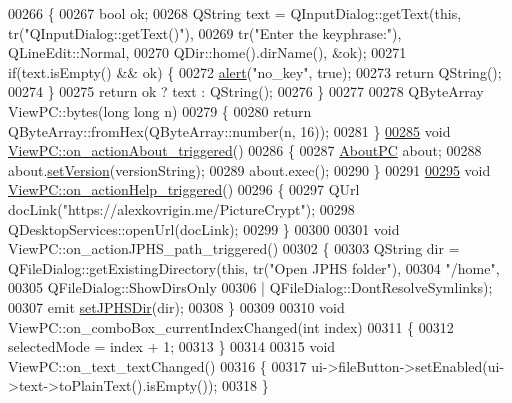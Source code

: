 \begin{DoxyCode}
00266 \{
00267     \textcolor{keywordtype}{bool} ok;
00268     QString text = QInputDialog::getText(\textcolor{keyword}{this}, tr(\textcolor{stringliteral}{"QInputDialog::getText()"}),
00269                                          tr(\textcolor{stringliteral}{"Enter the keyphrase:"}), QLineEdit::Normal,
00270                                          QDir::home().dirName(), &ok);
00271     \textcolor{keywordflow}{if}(text.isEmpty() && ok) \{
00272         \hyperlink{class_view_p_c_a7c467169467789561078abc9d4fe57bd}{alert}(\textcolor{stringliteral}{"no\_key"}, \textcolor{keyword}{true});
00273         \textcolor{keywordflow}{return} QString();
00274     \}
00275     \textcolor{keywordflow}{return} ok ? text : QString();
00276 \}
00277 
00278 QByteArray ViewPC::bytes(\textcolor{keywordtype}{long} \textcolor{keywordtype}{long} n)
00279 \{
00280     \textcolor{keywordflow}{return} QByteArray::fromHex(QByteArray::number(n, 16));
00281 \}
\hypertarget{viewpc_8cpp_source.tex_l00285}{}\hyperlink{class_view_p_c_a09a46da4d492eb3dde88f35dc58c997b}{00285} \textcolor{keywordtype}{void} \hyperlink{class_view_p_c_a09a46da4d492eb3dde88f35dc58c997b}{ViewPC::on\_actionAbout\_triggered}()
00286 \{
00287     \hyperlink{class_about_p_c}{AboutPC} about;
00288     about.\hyperlink{class_about_p_c_aa3815d4826d0c8d87122449537a0a4d5}{setVersion}(versionString);
00289     about.exec();
00290 \}
00291 
\hypertarget{viewpc_8cpp_source.tex_l00295}{}\hyperlink{class_view_p_c_a0d252ff4829260c6c76769fbd24b7cd7}{00295} \textcolor{keywordtype}{void} \hyperlink{class_view_p_c_a0d252ff4829260c6c76769fbd24b7cd7}{ViewPC::on\_actionHelp\_triggered}()
00296 \{
00297     QUrl docLink(\textcolor{stringliteral}{"https://alexkovrigin.me/PictureCrypt"});
00298     QDesktopServices::openUrl(docLink);
00299 \}
00300 
00301 \textcolor{keywordtype}{void} ViewPC::on\_actionJPHS\_path\_triggered()
00302 \{
00303     QString dir = QFileDialog::getExistingDirectory(\textcolor{keyword}{this}, tr(\textcolor{stringliteral}{"Open JPHS folder"}),
00304                                                     \textcolor{stringliteral}{"/home"},
00305                                                     QFileDialog::ShowDirsOnly
00306                                                     | QFileDialog::DontResolveSymlinks);
00307     emit \hyperlink{class_view_p_c_ae81085836c0c01bc9556a5b27eb8d19c}{setJPHSDir}(dir);
00308 \}
00309 
00310 \textcolor{keywordtype}{void} ViewPC::on\_comboBox\_currentIndexChanged(\textcolor{keywordtype}{int} index)
00311 \{
00312     selectedMode = index + 1;
00313 \}
00314 
00315 \textcolor{keywordtype}{void} ViewPC::on\_text\_textChanged()
00316 \{
00317     ui->fileButton->setEnabled(ui->text->toPlainText().isEmpty());
00318 \}
\end{DoxyCode}
